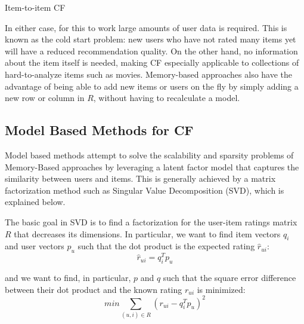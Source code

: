 \documentclass[cic,tc,english]{iiufrgs}
\begin{document}
\begin{algorithm}[H]
 \caption{Item-to-item CF}
\end{algorithm}

In either case, for this to work large amounts of user data is required. This is known as the cold start problem: new users who have not rated many items yet will have a reduced recommendation quality. On the other hand, no information about the item itself is needed, making CF especially applicable to collections of hard-to-analyze items such as movies. Memory-based approaches also have the advantage of being able to add new items or users on the fly by simply adding a new row or column in $R$, without having to recalculate a model.
 
\subsection{Model Based Methods for CF} 
\label{model-based-cf}
Model based methods attempt to solve the scalability and sparsity problems of Memory-Based approaches by leveraging a latent factor model that captures the similarity between users and items. This is generally achieved by a matrix factorization method such as Singular Value Decomposition (SVD), which is explained below.

The basic goal in SVD is to find a factorization for the user-item ratings matrix $R$ that decreases its dimensions. In particular, we want to find item vectors $q_i$ and user vectors $p_u$ such that the dot product is the expected rating $\hat{r}_{ui}$:
$$
\hat{r}_{ui} = q_i^Tp_u
$$

\noindent and we want to find, in particular, $p$ and $q$ such that the square error difference between their dot product and the known rating $r_{ui}$ is minimized:
$$
min \sum_{(u,i)\in R}{(r_{ui} -  q_i^Tp_u)^2}
$$
\end{document}
